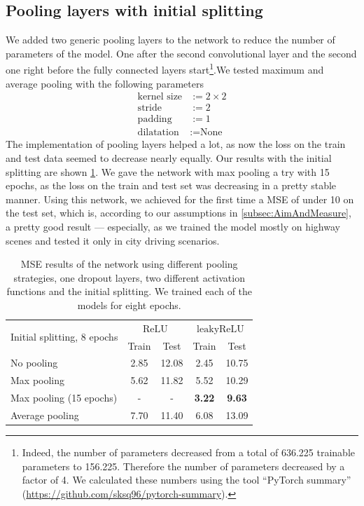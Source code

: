 \documentclass[conference]{IEEEtran}
\begin{document}
\subsection{Pooling layers with initial splitting}
We added two generic pooling layers to the network to reduce the number of parameters of the model. One after the second 
convolutional layer and the second one right before the fully connected layers start\footnote{Indeed, the number of 
parameters decreased from a total of 636.225 trainable parameters to 156.225. Therefore the number of parameters decreased by a 
factor of 4. We calculated these numbers using the tool \enquote{PyTorch summary} (\url{https://github.com/sksq96/pytorch-summary}).}.We tested maximum and average pooling with the following 
parameters
\begin{align*}
\text{kernel size} &:= 2\times 2\\
\text{stride} &:= 2\\
\text{padding} &:= 1\\
\text{dilatation} &:= \text{None}
\end{align*}
The implementation of pooling layers helped a lot, as now the loss on the train and test data seemed to 
decrease nearly equally. Our results with the initial splitting are shown 
\cref{tab:ResultsInitialSplitting}. We gave the network
with max pooling a try with 15 epochs, as the loss on the train and test set was decreasing in a pretty 
stable manner. Using this network, we achieved for the first time a MSE of under 10 on the test set,
which is, according to our assumptions in \cref{subsec:AimAndMeasure}, a 
pretty good result --- especially, as we trained the model mostly on highway scenes and tested it only 
in city driving scenarios.
\begin{table}[!t]
\normalsize
\centering
\begin{tabular}{lcccc}
\toprule
\multirow{2}{*}{Initial splitting, 8 epochs}  & \multicolumn{2}{c}{$\mathrm{ReLU}$} & \multicolumn{2}{c}{$\mathrm{leakyReLU}$} \\
 & Train & Test & Train & Test\\
\midrule
No pooling & 2.85 & 12.08 & 2.45 & 10.75 \\
Max pooling & 5.62 & 11.82 & 5.52 & 10.29 \\
Max pooling (15 epochs) & - & - & \textbf{3.22} & \textbf{9.63} \\
Average pooling & 7.70 & 11.40 & 6.08 & 13.09\\
\bottomrule
\end{tabular}
\caption{MSE results of the network using different pooling strategies, one dropout layers, two different activation functions and 
the initial splitting. We trained each of the models for eight epochs.}
\label{tab:ResultsInitialSplitting}
\end{table}
\end{document}

